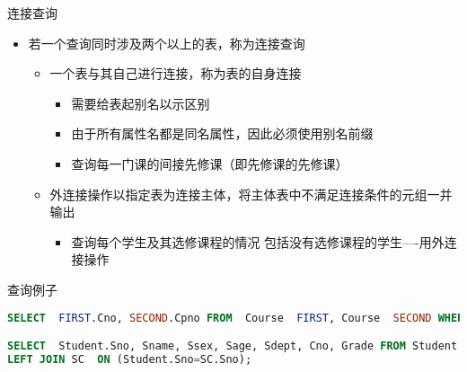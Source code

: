 \begin{frame}[fragile]{连接查询}
\begin{itemize}
    \item  若一个查询同时涉及两个以上的表，称为连接查询
 
    \begin{itemize}
        \item 一个表与其自己进行连接，称为表的自身连接
        \begin{itemize}
            \item 需要给表起别名以示区别
            \item 由于所有属性名都是同名属性，因此必须使用别名前缀
            \item 查询每一门课的间接先修课（即先修课的先修课）
        \end{itemize}
        \item 外连接操作以指定表为连接主体，将主体表中不满足连接条件的元组一并输出
        \begin{itemize}
            \item  查询每个学生及其选修课程的情况
包括没有选修课程的学生----用外连接操作

        \end{itemize}

    \end{itemize}
\end{itemize}
\begin{block}{查询例子}
\begin{lstlisting}[language=SQL]
SELECT  FIRST.Cno, SECOND.Cpno FROM  Course  FIRST, Course  SECOND WHERE FIRST.Cpno = SECOND.Cno; 

SELECT  Student.Sno, Sname, Ssex, Sage, Sdept, Cno, Grade FROM Student 
LEFT JOIN SC  ON (Student.Sno=SC.Sno);
\end{lstlisting}
\end{block}
\end{frame}



